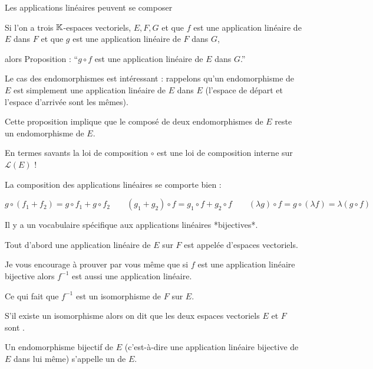 Les applications linéaires peuvent se composer 

Si l'on a trois $\mathbb{K}$-espaces vectoriels, $E, F, G$ 
et que  $f$ est une application linéaire de $E$ dans $F$
et que $g$ est une application linéaire de $F$ dans $G$,

alors Proposition : ``$g \circ f$ est une application linéaire de $E$ dans $G$.''


\change

Le cas des endomorphismes est intéressant : rappelons qu'un endomorphisme de $E$ est simplement 
une application linéaire de $E$ dans $E$ (l'espace de départ et l'espace d'arrivée sont les mêmes).

Cette proposition implique que le composé de deux endomorphismes de $E$ 
reste un endomorphisme de $E$. 

En termes savants la loi de composition $\circ$ est une loi de 
composition interne sur $\mathcal{L}(E)$ !

\change

La composition des applications linéaires se comporte bien :

$$g \circ (f_1+f_2)=g \circ f_1+ g \circ f_2 
\qquad 
(g_1+g_2) \circ f =g_1 \circ f + g_2 \circ f
\qquad 
(\lambda g) \circ f =g \circ (\lambda f) =\lambda (g \circ f)
$$



\diapo

Il y a un vocabulaire spécifique aux applications linéaires *bijectives*.

Tout d'abord une application linéaire  de $E$ sur $F$ est appelée 
   d'espaces vectoriels. 
 
 \change
  
Je vous encourage à prouver par vous même que si $f$ est une application linéaire bijective
alors $f^{-1}$ est aussi une application linéaire.

Ce qui fait que $f^{-1}$ est un isomorphisme de $F$ sur $E$.  

\change
 
 S'il existe un isomorphisme alors on dit que les deux espaces vectoriels $E$ et $F$ 
  sont .

  \change
  
Un endomorphisme bijectif de $E$ (c'est-à-dire une application linéaire bijective de $E$ dans lui même)
  s'appelle un  de $E$.
  
  \change
  
